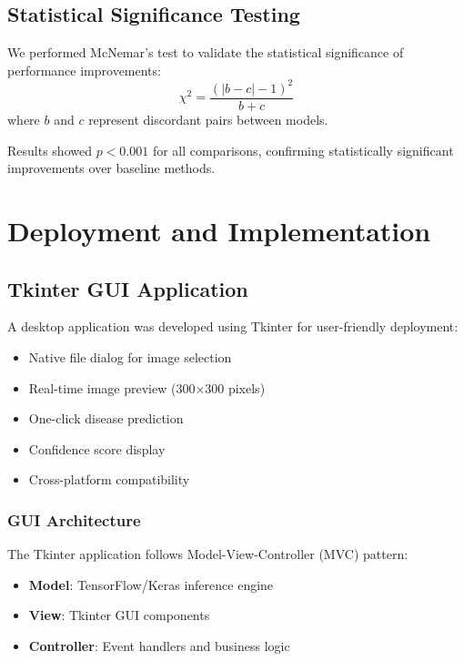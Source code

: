 \documentclass[conference,10pt,letterpaper]{IEEEtran}
\begin{document}
\subsection{Statistical Significance Testing}

We performed McNemar's test to validate the statistical significance of performance improvements:
\begin{equation}
\chi^2 = \frac{(|b-c| - 1)^2}{b + c}
\end{equation}
where $b$ and $c$ represent discordant pairs between models.

Results showed $p < 0.001$ for all comparisons, confirming statistically significant improvements over baseline methods.

\section{Deployment and Implementation}

\subsection{Tkinter GUI Application}

A desktop application was developed using Tkinter for user-friendly deployment:
\begin{itemize}
\item Native file dialog for image selection
\item Real-time image preview (300×300 pixels)
\item One-click disease prediction
\item Confidence score display
\item Cross-platform compatibility
\end{itemize}

\subsubsection{GUI Architecture}
The Tkinter application follows Model-View-Controller (MVC) pattern:
\begin{itemize}
\item \textbf{Model}: TensorFlow/Keras inference engine
\item \textbf{View}: Tkinter GUI components
\item \textbf{Controller}: Event handlers and business logic
\end{itemize}
\end{document}
